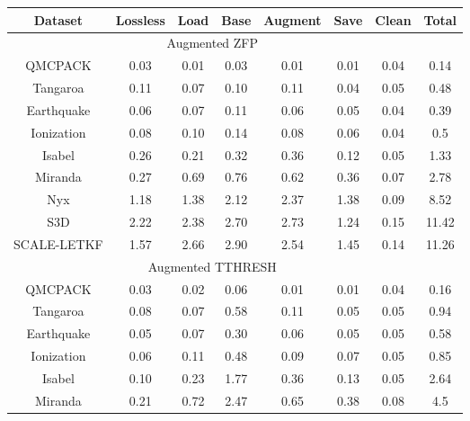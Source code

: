 \begin{table}[!ht]
\setlength{\tabcolsep}{2pt}
\centering
\begin{tabular}{cccccccc}
\hline
\multicolumn{1}{c|}{Dataset}     & Lossless & Load & Base  & Augment & Save & Clean & Total \\ \hline
\multicolumn{7}{c}{Augmented ZFP}                                                   &       \\ \hline
\multicolumn{1}{c|}{QMCPACK}     & 0.03     & 0.01 & 0.03  & 0.01    & 0.01 & 0.04  & 0.14  \\
\multicolumn{1}{c|}{Tangaroa}    & 0.11     & 0.07 & 0.10  & 0.11    & 0.04 & 0.05  & 0.48  \\
\multicolumn{1}{c|}{Earthquake}  & 0.06     & 0.07 & 0.11  & 0.06    & 0.05 & 0.04  & 0.39  \\
\multicolumn{1}{c|}{Ionization}  & 0.08     & 0.10 & 0.14  & 0.08    & 0.06 & 0.04  & 0.5   \\
\multicolumn{1}{c|}{Isabel}      & 0.26     & 0.21 & 0.32  & 0.36    & 0.12 & 0.05  & 1.33  \\
\multicolumn{1}{c|}{Miranda}     & 0.27     & 0.69 & 0.76  & 0.62    & 0.36 & 0.07  & 2.78  \\
\multicolumn{1}{c|}{Nyx}         & 1.18     & 1.38 & 2.12  & 2.37    & 1.38 & 0.09  & 8.52  \\
\multicolumn{1}{c|}{S3D}         & 2.22     & 2.38 & 2.70  & 2.73    & 1.24 & 0.15  & 11.42 \\
\multicolumn{1}{c|}{SCALE-LETKF} & 1.57     & 2.66 & 2.90  & 2.54    & 1.45 & 0.14  & 11.26 \\ \hline
\multicolumn{7}{c}{Augmented TTHRESH}                                               &       \\ \hline
\multicolumn{1}{c|}{QMCPACK}     & 0.03     & 0.02 & 0.06  & 0.01    & 0.01 & 0.04  & 0.16  \\
\multicolumn{1}{c|}{Tangaroa}    & 0.08     & 0.07 & 0.58  & 0.11    & 0.05 & 0.05  & 0.94  \\
\multicolumn{1}{c|}{Earthquake}  & 0.05     & 0.07 & 0.30  & 0.06    & 0.05 & 0.05  & 0.58  \\
\multicolumn{1}{c|}{Ionization}  & 0.06     & 0.11 & 0.48  & 0.09    & 0.07 & 0.05  & 0.85  \\
\multicolumn{1}{c|}{Isabel}      & 0.10     & 0.23 & 1.77  & 0.36    & 0.13 & 0.05  & 2.64  \\
\multicolumn{1}{c|}{Miranda}     & 0.21     & 0.72 & 2.47  & 0.65    & 0.38 & 0.08  & 4.5   \\

\end{tabular}
\end{table}
